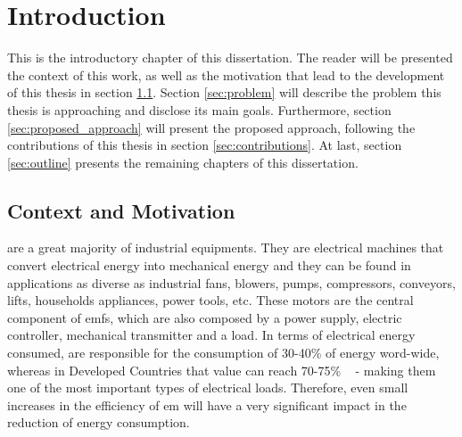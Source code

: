\newcommand{\unlthesis}{\emph{unlthesis}}
\newcommand{\unlthesisclass}{\texttt{unlthesis.cls}}

\chapter{Introduction}  
\label{cha:introduction} 

This is the introductory chapter of this dissertation. The reader will be presented the context of this work, as well as the motivation that lead to the development of this thesis in section \ref{sec:motivation}. Section \ref{sec:problem} will describe the problem this thesis is approaching and disclose its main goals. Furthermore, section \ref{sec:proposed_approach} will present the proposed approach, following the contributions of this thesis in section \ref{sec:contributions}. At last, section \ref{sec:outline} presents the remaining chapters of this dissertation.

\section{Context and Motivation} %
\label{sec:motivation}

 are a great majority of industrial equipments. They are electrical machines that convert electrical energy into mechanical energy and they can be found in applications as diverse as industrial fans, blowers, pumps, compressors, conveyors, lifts, households appliances, power tools, etc. 
These motors are the central component of \acrfull{emfs}, which are also composed by a power supply, electric controller, mechanical transmitter and a load. 
In terms of electrical energy consumed,  are responsible for the consumption of 30-40\% of energy word-wide, whereas in Developed Countries that value can reach 70-75\% ~\cite{Ferreira1} - making them one of the most important types of electrical loads. 
Therefore, even small increases in the efficiency of \acrshort{em} will have a very significant impact in the reduction of energy consumption.


